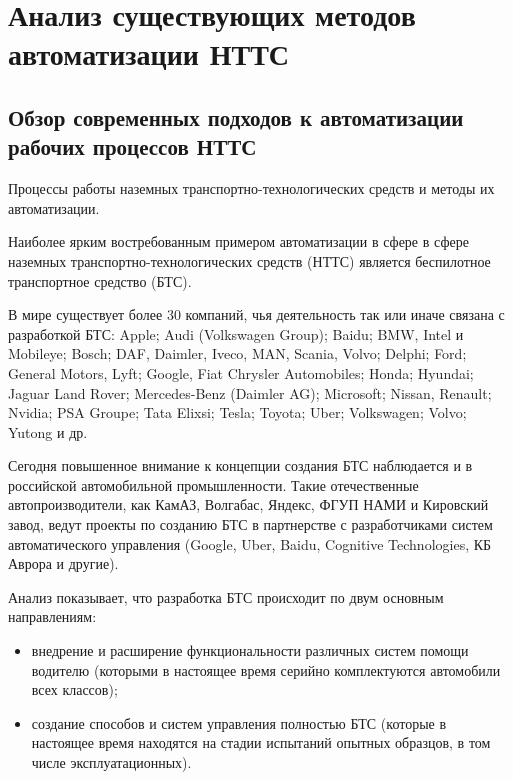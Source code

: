 \chapter{Анализ существующих методов автоматизации НТТС}\label{ch:ch1}

\section{Обзор современных подходов к автоматизации рабочих процессов НТТС}\label{sec:ch1/sec1}

Процессы работы наземных транспортно-технологических средств и методы их автоматизации.

Наиболее ярким востребованным примером автоматизации в сфере в сфере наземных транспортно-технологических средств (НТТС) является беспилотное транспортное средство (БТС).

В мире существует более 30 компаний, чья деятельность так или иначе связана с разработкой БТС: Apple; Audi (Volkswagen Group); Baidu; BMW, Intel и Mobileye; Bosch; DAF, Daimler, Iveco, MAN, Scania, Volvo; Delphi; Ford; General Motors, Lyft; Google, Fiat Chrysler Automobiles; Honda; Hyundai; Jaguar Land Rover; Mercedes-Benz (Daimler AG); Microsoft; Nissan, Renault; Nvidia; PSA Groupe; Tata Elixsi; Tesla; Toyota; Uber; Volkswagen; Volvo; Yutong и др.

Сегодня повышенное внимание к концепции создания БТС наблюдается и в российской автомобильной промышленности. Такие отечественные автопроизводители, как КамАЗ, Волгабас, Яндекс, ФГУП НАМИ и Кировский завод, ведут проекты по созданию БТС в партнерстве с разработчиками систем автоматического управления (Google, Uber, Baidu, Cognitive Technologies, КБ Аврора и другие).

Анализ показывает, что разработка БТС происходит по двум основным направлениям:

\begin{itemize}
    \item внедрение и расширение функциональности различных систем помощи водителю (которыми в настоящее время серийно комплектуются автомобили всех классов);
    \item создание способов и систем управления полностью БТС (которые в настоящее время находятся на стадии испытаний опытных образцов, в том числе эксплуатационных).
\end{itemize}

